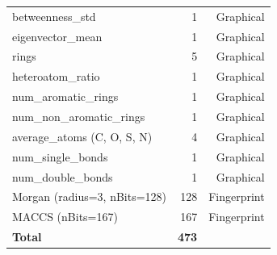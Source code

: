 \documentclass{article}
\begin{document}
\begin{table}[!ht]
\begin{tabular}{lrr}
betweenness\_std         & 1   & Graphical \\
eigenvector\_mean        & 1   & Graphical \\
rings                    & 5   & Graphical \\
heteroatom\_ratio        & 1   & Graphical \\
num\_aromatic\_rings     & 1   & Graphical \\
num\_non\_aromatic\_rings & 1  & Graphical \\
average\_atoms (C, O, S, N) & 4 & Graphical \\
num\_single\_bonds       & 1   & Graphical \\
num\_double\_bonds       & 1   & Graphical \\
Morgan (radius=3, nBits=128) & 128 & Fingerprint \\
MACCS (nBits=167)        & 167 & Fingerprint \\
\midrule
\textbf{Total}           & \textbf{473} & \\
\bottomrule
\end{tabular}
\end{table}
\end{document}
